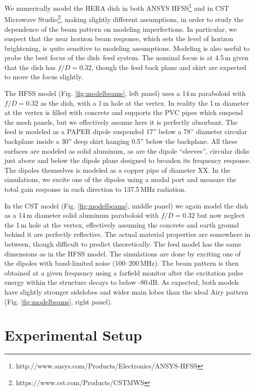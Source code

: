 \documentclass{emulateapj}
\begin{document}
We numerically model the HERA dish in both ANSYS HFSS\footnote{http://www.ansys.com/Products/Electronics/ANSYS-HFSS} and in CST Microwave Studio\footnote{https://www.cst.com/Products/CSTMWS}, making slightly different assumptions, in order to study the dependence of the beam pattern on modeling imperfections. In particular, we suspect that the near horizon beam response, which sets the level of horizon brightening, is quite sensitive to modeling assumptions. Modeling is also useful to probe the best focus of the dish--feed system. The nominal focus is at 4.5\,m given that the dish has $f/D=0.32$, though the feed back plane and skirt are expected to move the focus slightly.

The HFSS model (Fig. \ref{fig:modelbeams}, left panel) uses a 14\,m paraboloid with $f/D=0.32$ as the dish, with a 1\,m hole at the vertex. In reality the 1\,m diameter at the vertex is filled with concrete and supports the PVC pipes which suspend the mesh panels, but we effectively assume here it is perfectly absorbant.  The feed is modeled as a PAPER dipole suspended 17'' below a 78'' diameter circular backplane inside a 30'' deep skirt hanging 0.5'' below the backplane. All these surfaces are modeled as solid aluminum, as are the dipole ``sleeves'', circular disks just above and below the dipole plane designed to broaden its frequency response. The dipoles themselves is modeled as a copper pipe of diameter XX. In the simulations, we excite one of the dipoles using a modal port and measure the total gain response in each direction to 137.5\,MHz radiation.

In the CST model (Fig. \ref{fig:modelbeams}, middle panel) we again model the dish as a 14\,m diameter solid aluminum paraboloid with $f/D=0.32$ but now neglect the 1\,m hole at the vertex, effectively assuming the concrete and earth ground behind it are perfectly reflective. The actual material properties are somewhere in between, though difficult to predict theoretically. The feed model has the same dimensions as in the HFSS model. The simulations are done by exciting one of the dipoles with band-limited noise (100--200\,MHz). The beam pattern is then obtained at a given frequency using a farfield monitor after the excitation pulse energy within the structure decays to below -80\,dB. As expected, both models have slightly stronger sidelobes and wider main lobes than the ideal Airy pattern (Fig. \ref{fig:modelbeams}, right panel).

\section{Experimental Setup}
\end{document}
